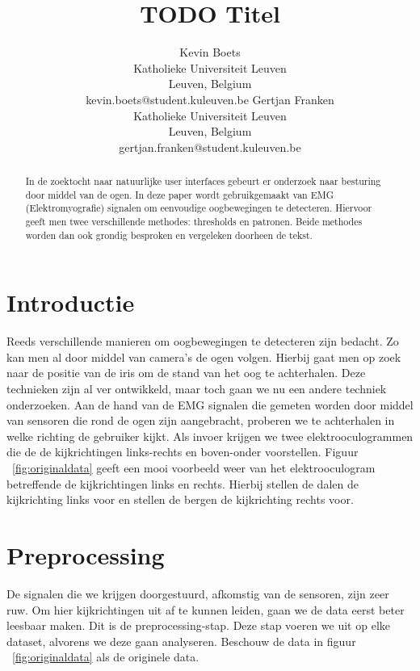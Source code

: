 \documentclass{article}
\title{TODO Titel}
\author{Kevin Boets \\ Katholieke Universiteit Leuven\\ Leuven, Belgium \\ kevin.boets@student.kuleuven.be
\And
Gertjan Franken \\ Katholieke Universiteit Leuven\\ Leuven, Belgium \\ gertjan.franken@student.kuleuven.be}
\begin{document}
\maketitle

\begin{abstract}
In de zoektocht naar natuurlijke user interfaces gebeurt er onderzoek naar besturing door middel van de ogen. In deze paper wordt gebruikgemaakt van EMG (Elektromyografie) signalen om eenvoudige oogbewegingen te detecteren. Hiervoor geeft men twee verschillende methodes: thresholds en patronen. Beide methodes worden dan ook grondig besproken en vergeleken doorheen de tekst.
\end{abstract}

\section{Introductie}

Reeds verschillende manieren om oogbewegingen te detecteren zijn bedacht. Zo kan men al door middel van camera's de ogen volgen. Hierbij gaat men op zoek naar de positie van de iris om de stand van het oog te achterhalen. Deze technieken zijn al ver ontwikkeld, maar toch gaan we nu een andere techniek onderzoeken. Aan de hand van de EMG signalen die gemeten worden door middel van sensoren die rond de ogen zijn aangebracht, proberen we te achterhalen in welke richting de gebruiker kijkt. Als invoer krijgen we twee elektrooculogrammen die de de kijkrichtingen links-rechts en boven-onder voorstellen. Figuur ~\ref{fig:originaldata} geeft een mooi voorbeeld weer van het elektrooculogram betreffende de kijkrichtingen links en rechts. Hierbij stellen de dalen de kijkrichting links voor en stellen de bergen de kijkrichting rechts voor.

\section{Preprocessing}

De signalen die we krijgen doorgestuurd, afkomstig van de sensoren, zijn zeer ruw. Om hier kijkrichtingen uit af te kunnen leiden, gaan we de data eerst beter leesbaar maken. Dit is de preprocessing-stap. Deze stap voeren we uit op elke dataset,  alvorens we deze gaan analyseren. Beschouw de data in figuur ~\ref{fig:originaldata} als de originele data.
\end{document}
